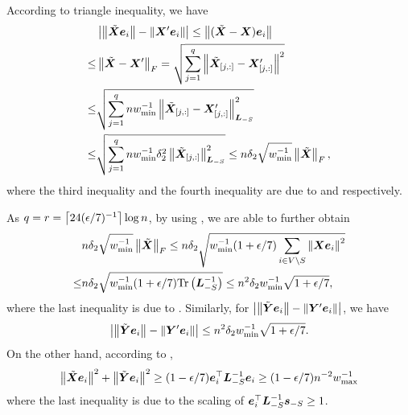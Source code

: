 \documentclass[10pt,journal,compsoc,twocolumn,twoside]{IEEEtran}
\begin{document}
\begin{IEEEproof}
    According to triangle inequality, we have
    \begin{align*}
            & \left|\left\Vert\tilde{\boldsymbol{X}}\boldsymbol{e}_i\right\Vert-\left\Vert\boldsymbol{X}'\boldsymbol{e}_i\right\Vert \right|\le\left\Vert(\tilde{\boldsymbol{X}}-\boldsymbol{X})\boldsymbol{e}_i\right\Vert                                                   \\
        \le & \left\Vert\tilde{\boldsymbol{X}}-\boldsymbol{X}'\right\Vert_{F}= \sqrt{\sum_{j=1}^q\left\Vert\tilde{\boldsymbol{X}}_{[j,:]}-\boldsymbol{X}'_{[j,:]}\right\Vert^2}                                             \\
        \le & \sqrt{\sum_{j=1}^qnw_{\min}^{-1}\left\Vert\tilde{\boldsymbol{X}}_{[j,:]}-\boldsymbol{X}'_{[j,:]}\right\Vert_{\boldsymbol{L}_{-S}}^2}                                                   \\
        \le & \sqrt{\sum_{j=1}^qnw_{\min}^{-1}\delta_2^2\left\Vert\tilde{\boldsymbol{X}}_{[j,:]}\right\Vert_{\boldsymbol{L}_{-S}}^2}\le n\delta_2\sqrt{w_{\min}^{-1}}\left\Vert\tilde{\boldsymbol{X}}\right\Vert_F,
    \end{align*}
    where the third inequality and the fourth inequality are due to  and  respectively.

    As \(q=r=\left\lceil24(\epsilon/7)^{-1}\right\rceil\log n\), by using , we are able to further obtain
    \begin{align*}
            & n\delta_2\sqrt{w_{\min}^{-1}}\left\Vert\tilde{\boldsymbol{X}}\right\Vert_F\le n\delta_2\sqrt{w_{\min}^{-1}(1+\epsilon/7)\sum_{i\in V\setminus S}\left\Vert\boldsymbol{X}\boldsymbol{e}_i\right\Vert^2} \\
        \le & n\delta_2\sqrt{w_{\min}^{-1}(1+\epsilon/7)\mathrm{Tr}\left(\boldsymbol{L}_{-S}^{-1}\right)}\le n^2\delta_2w_{\min}^{-1}\sqrt{1+\epsilon/7},
    \end{align*}
    where the last inequality is due to .
    Similarly, for \(\left|\left\Vert\tilde{\boldsymbol{Y}}\boldsymbol{e}_i\right\Vert-\left\Vert\boldsymbol{Y}'\boldsymbol{e}_i\right\Vert \right|\), we have
    \begin{equation}\label{eq:approx-maty-raw}
        \left|\left\Vert\tilde{\boldsymbol{Y}}\boldsymbol{e}_i\right\Vert-\left\Vert\boldsymbol{Y}'\boldsymbol{e}_i\right\Vert \right|\le n^2\delta_2w_{\min}^{-1}\sqrt{1+\epsilon/7}.
    \end{equation}
    On the other hand, according to ,
    \[\left\Vert\tilde{\boldsymbol{X}}\boldsymbol{e}_i\right\Vert^2+\left\Vert\tilde{\boldsymbol{Y}}\boldsymbol{e}_i\right\Vert^2\ge(1-\epsilon/7)\boldsymbol{e}_i^\top\boldsymbol{L}_{-S}^{-1}\boldsymbol{e}_i\ge(1-\epsilon/7)n^{-2}w_{\max}^{-1}\]
    where the last inequality is due to the scaling of \(\boldsymbol{e}_i^\top\boldsymbol{L}_{-S}^{-1}\boldsymbol{s}_{-S}\ge1\).


\end{IEEEproof}
\end{document}
